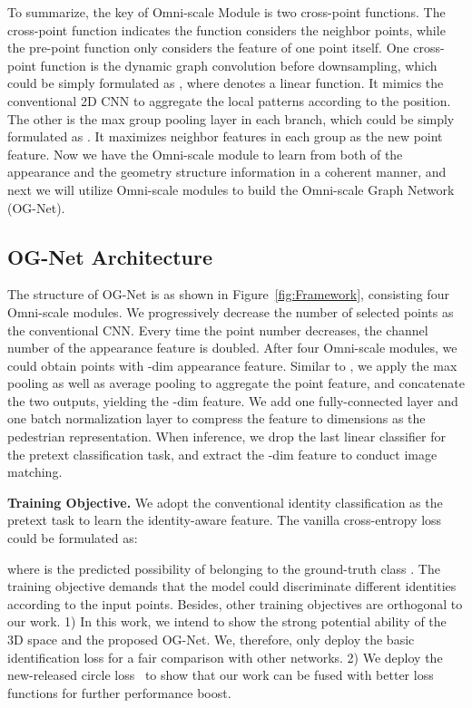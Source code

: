 \documentclass[journal]{IEEEtran}
\begin{document}
To summarize, the key of Omni-scale Module is two cross-point functions. The cross-point function indicates the function considers the neighbor points, while the pre-point function only considers the feature of one point itself. One cross-point function is the dynamic graph convolution before downsampling, which could be simply formulated as , where  denotes a linear function. It mimics the conventional 2D CNN to aggregate the local patterns according to the position.
The other is the max group pooling layer in each branch, which could be simply formulated as . It maximizes neighbor features in each group as the new point feature. 
Now we have the Omni-scale module to learn from both of the appearance and the geometry structure information in a coherent manner, and next we will utilize Omni-scale modules to build the Omni-scale Graph Network (OG-Net).

\subsection{OG-Net Architecture} 
The structure of OG-Net is as shown in Figure~\ref{fig:Framework}, consisting four Omni-scale modules. We progressively decrease the number of selected points as the conventional CNN. Every time the point number decreases, the channel number of the appearance feature is doubled. After four Omni-scale modules, we could obtain  points with -dim appearance feature. Similar to \cite{wang2019dynamic}, we apply the max pooling as well as average pooling to aggregate the point feature, and concatenate the two outputs, yielding the -dim feature. We add one fully-connected layer and one batch normalization layer to compress the feature to  dimensions as the pedestrian representation. When inference, we drop the last linear classifier for the pretext classification task, and extract the -dim feature to conduct image matching. 

\noindent\textbf{Training Objective.} We adopt the conventional identity classification as the pretext task to learn the identity-aware feature. The vanilla cross-entropy loss could be formulated as:
 
where  is the predicted possibility of  belonging to the ground-truth class . The training objective demands that the model could discriminate different identities according to the input points. Besides, other training objectives are orthogonal to our work. 
1) In this work, we intend to show the strong potential ability of the 3D space and the proposed OG-Net. We, therefore, only deploy the basic identification loss for a fair comparison with other networks.
2) We deploy the new-released circle loss~\cite{sun2020circle} to show that our work can be fused with better loss functions for further performance boost.
\end{document}

